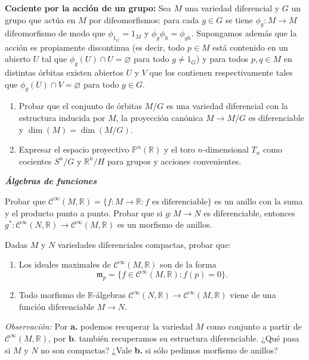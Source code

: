 \documentclass[12pt, a4paper]{amsart}
\theoremstyle{definition}
\newcommand{\RR}{\mathbb{R}}      %
\let\emptyset\varnothing
\begin{document}
\begin{question}
\textbf{Cociente por la acción de un grupo:} Sea $M$ una variedad diferencial y $G$ un grupo que actúa en $M$ por difeomorfismos: para cada $g\in G$ se tiene $\phi_g:M\to M$ difeomorfismo de modo que $\phi_{1_G}=1_M$ y $\phi_g\phi_h=\phi_{gh}$. Supongamos además que la acción es propiamente discontinua (es decir, todo $p\in M$ está contenido en un abierto $U$ tal que $\phi_g(U)\cap U=\emptyset$ para todo $g\neq 1_G$) y para todos $p,q\in M$ en distintas órbitas existen abiertos $U$ y $V$ que los contienen respectivamente tales que $\phi_g(U)\cap V = \emptyset$ para todo $g\in G$.
\begin{enumerate}[label=\textbf{\alph*.}]
\item Probar que el conjunto de órbitas $M/G$ es una variedad diferencial con la estructura inducida por $M$, la proyección canónica $M\to M/G$ es diferenciable y $\dim(M)=\dim(M/G)$.
\item Expresar el espacio proyectivo $\mathbb{P}^n(\RR)$ y el toro $n$-dimensional $T_n$ como cocientes $S^n/G$ y $\RR^n/H$ para grupos y acciones convenientes.
\end{enumerate}
\end{question}

\textsl{\textbf{Álgebras de funciones}}
\vspace{1em}


\begin{question}
Probar que $\mathscr{C}^\infty(M,\RR)=\{f:M\to\RR:f\text{ es diferenciable}\}$ es un anillo con la suma y el producto punto a punto. Probar que si $g:M\to N$ es diferenciable, entonces $g^*:\mathscr{C}^\infty(N,\RR)\to\mathscr{C}^\infty(M,\RR)$ es un morfismo de anillos.
\end{question}

\begin{question}
Dadas $M$ y $N$ variedades diferenciales compactas, probar que:
\begin{enumerate}[label=\textbf{\alph*.}]
\item Los ideales maximales de $\mathscr{C}^\infty(M,\RR)$ son de la forma $$\mathfrak{m}_p = \{f\in\mathscr{C}^\infty(M,\RR): f(p)=0\}.$$
\item Todo morfismo de $\RR$-álgebras $\mathscr{C}^\infty(N,\RR)\to\mathscr{C}^\infty(M,\RR)$ viene de una función diferenciable $M\to N$.
\end{enumerate}
\vspace{1em}


\noindent \textit{Observación:} Por \textbf{a.} podemos recuperar la variedad $M$ como conjunto a partir de $\mathscr{C}^\infty(M,\RR)$, por $\textbf{b.}$ también recuperamos su estructura diferenciable. ¿Qué pasa si $M$ y $N$ no son compactas? ¿Vale \textbf{b.} si sólo pedimos morfismo de anillos?
\end{question}
\end{document}
